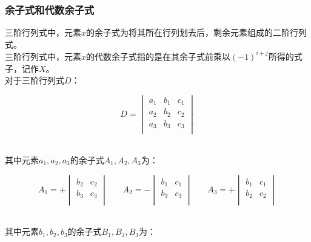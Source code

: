 \documentclass[UTF8]{ctexart}
\begin{document}
\subsubsection{余子式和代数余子式}
    三阶行列式中，元素$x$的余子式为将其所在行列划去后，剩余元素组成的二阶行列式。\\[3mm]
    三阶行列式中，元素$x$的代数余子式指的是在其余子式前乘以$(-1)^{i+j}$所得的式子，记作$X$。\\[3mm]
    对于三阶行列式$D$：
    \begin{large}
        \begin{equation*}
            D=
            \begin{vmatrix}
                a_1&b_1&c_1\\
                a_2&b_2&c_2\\
                a_3&b_3&c_3\\
            \end{vmatrix}
        \end{equation*}
    \end{large}\\
    其中元素$a_1,a_2,a_3$的余子式$A_1,A_2,A_3$为：\vspace{5pt}
    \begin{large}
        \begin{equation*}
            A_1=+
            \begin{vmatrix}
                b_2&c_2\\
                b_3&c_3\\
            \end{vmatrix}~~~~~~~~
            A_2=-
            \begin{vmatrix}
                b_1&c_1\\
                b_3&c_3\\
            \end{vmatrix}~~~~~~~~
            A_3=+
            \begin{vmatrix}
                b_1&c_1\\
                b_2&c_2\\
            \end{vmatrix}
        \end{equation*}
    \end{large}\\
    其中元素$b_1,b_2,b_3$的余子式$B_1,B_2,B_3$为：\vspace{5pt}
\end{document}

